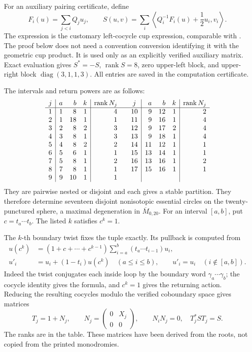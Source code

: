 For an auxiliary pairing certificate, define
\[
 F_i(u)=\sum_{j<i}Q_j u_j,\qquad
 S(u,v)=\sum_i\left\langle Q_i^{-1}F_i(u)+\frac12u_i,v_i\right\rangle.
\]
The expression is the customary left-cocycle cup expression, comparable with
\cite[Theorem 2.5]{G34:DWdual}.  The proof below does not need a convention
conversion identifying it with the geometric cup product.  It is used only
as an explicitly verified auxiliary matrix.  Exact evaluation gives
\(S^*=-S\), \(\operatorname{rank}S=8\), zero upper-left block, and
upper-right block \(\operatorname{diag}(3,1,1,3)\).  All entries are saved
in the computation certificate.

The intervals and return powers are as follows:
\[
\begin{array}{c|rrr|r@{\qquad}c|rrr|r}
 j&a&b&k&\operatorname{rank}N_j&j&a&b&k&\operatorname{rank}N_j\\\hline
1&1&8&1&4&10&9&12&1&2\\
2&1&18&1&1&11&9&16&1&4\\
3&2&8&2&3&12&9&17&2&4\\
4&3&8&1&3&13&9&18&1&4\\
5&4&8&2&2&14&11&12&1&1\\
6&5&6&1&1&15&13&14&1&1\\
7&5&8&1&2&16&13&16&1&2\\
8&7&8&1&1&17&15&16&1&1\\
9&9&10&1&1&&&&&
\end{array}
\]
They are pairwise nested or disjoint and each gives a stable partition.
They therefore determine seventeen disjoint nonisotopic essential circles
on the twenty-punctured sphere, a maximal degeneration in
\(\overline M_{0,20}\).  For an interval \([a,b]\), put
\(c=t_a\cdots t_b\).  The listed \(k\) satisfies \(c^k=1\).

The \(k\)-th boundary twist fixes the tuple exactly.  Its pullback is computed
from
\[
\begin{split}
 u(c^k)&=(1+c+\cdots+c^{k-1})
             \sum_{i=a}^b(t_a\cdots t_{i-1})u_i,\\
 u'_i&=u_i+(1-t_i)u(c^k)\quad(a\le i\le b),\qquad
 u'_i=u_i\quad(i\notin[a,b]).
\end{split}
\]
Indeed the twist conjugates each inside loop by the boundary word
\(\gamma_a\cdots\gamma_b\); the cocycle identity gives the formula, and
\(c^k=1\) gives the returning action.  Reducing the resulting cocycles
modulo the verified coboundary space gives matrices
\[
 T_j=1+N_j,\qquad N_j=
 \begin{pmatrix}0&X_j\\0&0\end{pmatrix},\qquad
 N_iN_j=0,\quad T_j^*ST_j=S.
\]
The ranks are in the table.  These matrices have been derived from the roots,
not copied from the printed monodromies.

